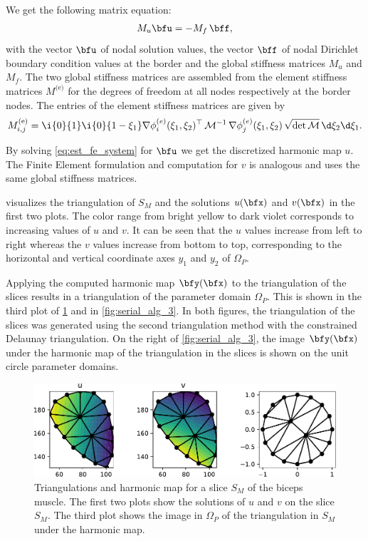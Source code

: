 We get the following matrix equation:
\begin{align}\label{eq:est_fe_system}
  M_u \bfu = -M_f\,\bff,
\end{align}
with the vector $\bfu$ of nodal solution values, the vector $\bff$ of nodal Dirichlet boundary condition values at the border and the global stiffness matrices $M_u$ and $M_f$. The two global stiffness matrices are assembled from the element stiffness matrices $M^\text{(e)}$ for the degrees of freedom at all nodes respectively at the border nodes. The entries of the element stiffness matrices are given by
\begin{align*}
  M^\text{(e)}_{i,j} = \i{0}{1}\i{0}{1-\xi_1}   \nabla \phi_i^{(e)}(\xi_1,\xi_2)^\top \, \mathcal{M}^{-1} \, \nabla \phi_j^{(e)}(\xi_1,\xi_2) \, \sqrt{\det{\mathcal{M}}}  \,\d\xi_2\d\xi_1.
\end{align*}

By solving \cref{eq:est_fe_system} for $\bfu$ we get the discretized harmonic map $u$.
The Finite Element formulation and computation for $v$ is analogous and uses the same global stiffness matrices.

 visualizes the triangulation of $S_M$ and the solutions $u(\bfx)$ and $v(\bfx)$ in the first two plots. The color range from bright yellow to dark violet corresponds to increasing values of $u$ and $v$. It can be seen that the $u$ values increase from left to right whereas the $v$ values increase from bottom to top, corresponding to the horizontal and vertical coordinate axes $y_1$ and $y_2$ of $\Omega_P$.


Applying the computed harmonic map $\bfy(\bfx)$ to the triangulation of the slices results in a triangulation of the parameter domain $\Omega_P$. This is shown in the third plot of \cref{fig:harmonic_map_solution} and in \cref{fig:serial_alg_3}.
In both figures, the triangulation of the slices was generated using the second triangulation method with the constrained Delaunay triangulation. On the right of \cref{fig:serial_alg_3}, the image $\bfy(\bfx)$ under the harmonic map of the triangulation in the slices is shown on the unit circle parameter domains.

\begin{figure}%
  \centering%
  \includegraphics[width=\textwidth]{images/fiber_creation/harmonic_map_9b.pdf}%
  \caption{Triangulations and harmonic map for a slice $S_M$ of the biceps muscle. The first two plots show the solutions of $u$ and $v$ on the slice $S_M$. The third plot shows the image in $\Omega_P$ of the triangulation in $S_M$ under the harmonic map.}%
  \label{fig:harmonic_map_solution}%
\end{figure}%

